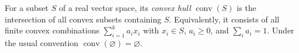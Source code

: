 
For a subset $S$ of a real vector space, its \emph{convex hull} $\operatorname{conv}(S)$ is the intersection of all convex subsets containing $S$. Equivalently, it consists of all finite convex combinations $\sum_{i=1}^k a_ix_i$ with $x_i\in S$, $a_i\ge0$, and $\sum_i a_i=1$. Under the usual convention $\operatorname{conv}(\varnothing)=\varnothing$.
